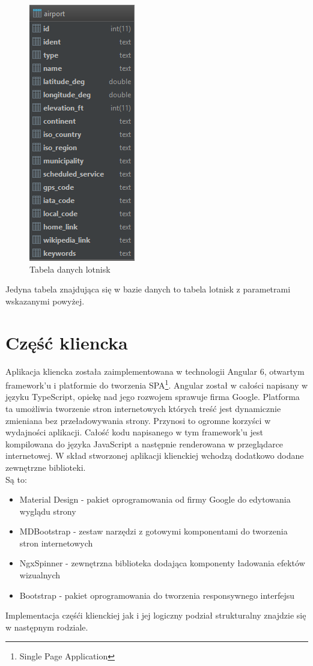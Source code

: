 \documentclass[12pt, twoside]{report}
\begin{document}
\begin{figure}[!ht]
\centering
\includegraphics[scale=0.80, keepaspectratio]{database.png}
\caption{Tabela danych lotnisk}
\label{fig:database}
\end{figure}
Jedyna tabela znajdująca się w bazie danych to tabela lotnisk z parametrami wskazanymi powyżej.

\section{Część kliencka}
Aplikacja kliencka została zaimplementowana w technologii Angular 6, otwartym framework'u i platformie do tworzenia SPA\footnote{Single Page Application}. Angular został w całości napisany w języku TypeScript, opiekę nad jego rozwojem sprawuje firma Google. Platforma ta umożliwia tworzenie stron internetowych których treść jest dynamicznie zmieniana bez przeładowywania strony. Przynosi to ogromne korzyści w wydajności aplikacji. Całość kodu napisanego w tym framework'u jest kompilowana do języka JavaScript a następnie renderowana w przeglądarce internetowej. W skład stworzonej aplikacji klienckiej wchodzą dodatkowo dodane zewnętrzne biblioteki.\\ Są to: 
\begin{itemize}[noitemsep,topsep=0pt]
\item Material Design - pakiet oprogramowania od firmy Google do edytowania wyglądu strony
\item MDBootstrap - zestaw narzędzi z gotowymi komponentami do tworzenia stron internetowych
\item NgxSpinner - zewnętrzna biblioteka dodająca komponenty ładowania efektów wizualnych
\item Bootstrap - pakiet oprogramowania do tworzenia responsywnego interfejsu
\end{itemize}
Implementacja częśći klienckiej jak i jej logiczny podział strukturalny znajdzie się w następnym rodziale.
\end{document}
